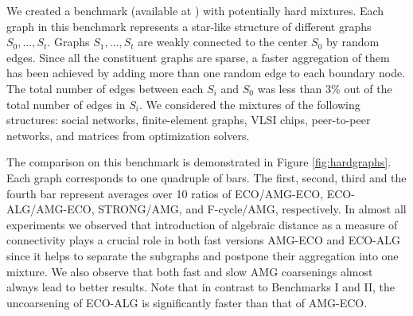 \documentclass{llncs}
\begin{document}
\par We created a benchmark (available at \cite{dimacs10}) with potentially hard mixtures. Each graph in this benchmark represents a star-like structure of different graphs $S_0,\dots,S_t$. Graphs $S_1,\dots,S_t$ are weakly connected to the center $S_0$ by random edges. Since all the constituent 
graphs are sparse, a faster aggregation of them has been achieved by adding more than one random edge to each boundary node. The total number of edges between each $S_i$ and $S_0$ was less than 3\% out of the total number of edges in $S_i$. We considered the mixtures of the following structures: social networks, finite-element graphs, VLSI chips, peer-to-peer networks, and matrices from optimization solvers.
\par The comparison on this benchmark is demonstrated in Figure \ref{fig:hardgraphs}. Each graph corresponds to one quadruple of bars. The first, second, third and the fourth bar represent averages over 10 ratios of ECO/AMG-ECO, ECO-ALG/AMG-ECO, STRONG/AMG, and F-cycle/AMG, respectively. In almost all experiments we observed that introduction of algebraic distance as a measure of connectivity plays a crucial role in both fast versions AMG-ECO and ECO-ALG since it
helps to separate the subgraphs and postpone their aggregation into one mixture. We also observe that both fast and slow AMG coarsenings almost always lead to better results. Note that in contrast to Benchmarks I and  II, the uncoarsening of ECO-ALG is significantly faster than that of AMG-ECO. 
\end{document}
